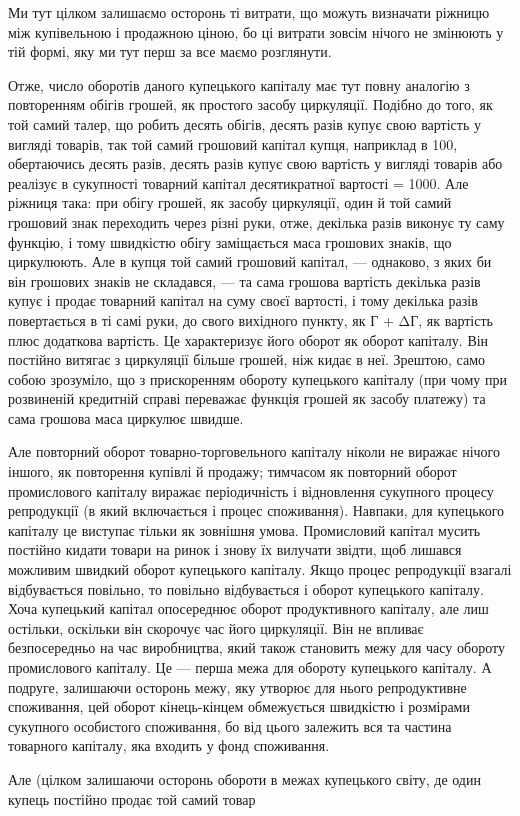 Ми тут цілком залишаємо осторонь ті витрати, що можуть
визначати ріжницю між купівельною і продажною ціною, бо ці
витрати зовсім нічого не змінюють у тій формі, яку ми тут
перш за все маємо розглянути.

Отже, число оборотів даного купецького капіталу має
тут повну аналогію з повторенням обігів грошей, як простого
засобу циркуляції. Подібно до того, як той самий талер, що
робить десять обігів, десять разів купує свою вартість у вигляді
товарів, так той самий грошовий капітал купця, наприклад
в 100, обертаючись десять разів, десять разів купує свою вартість
у вигляді товарів або реалізує в сукупності товарний капітал
десятикратної вартості = 1000. Але ріжниця така: при обігу
грошей, як засобу циркуляції, один й той самий грошовий знак
переходить через різні руки, отже, декілька разів виконує ту
саму функцію, і тому швидкістю обігу заміщається маса грошових
знаків, що циркулюють. Але в купця той самий грошовий
капітал, — однаково, з яких би він грошових знаків не складався, —
та сама грошова вартість декілька разів купує і продає товарний
капітал на суму своєї вартості, і тому декілька разів повертається
в ті самі руки, до свого вихідного пункту, як Г + ΔГ,
як вартість плюс додаткова вартість. Це характеризує його
оборот як оборот капіталу. Він постійно витягає з циркуляції
більше грошей, ніж кидає в неї. Зрештою, само собою зрозуміло,
що з прискоренням обороту купецького капіталу (при чому при
розвиненій кредитній справі переважає функція грошей як засобу
платежу) та сама грошова маса циркулює швидше.

Але повторний оборот товарно-торговельного капіталу ніколи
не виражає нічого іншого, як повторення купівлі й продажу;
тимчасом як повторний оборот промислового капіталу виражає
періодичність і відновлення сукупного процесу репродукції (в
який включається і процес споживання). Навпаки, для купецького
капіталу це виступає тільки як зовнішня умова. Промисловий
капітал мусить постійно кидати товари на ринок і знову їх вилучати
звідти, щоб лишався можливим швидкий оборот купецького
капіталу. Якщо процес репродукції взагалі відбувається
повільно, то повільно відбувається і оборот купецького капіталу.
Хоча купецький капітал опосереднює оборот продуктивного
капіталу, але лиш остільки, оскільки він скорочує час його циркуляції.
Він не впливає безпосередньо на час виробництва, який
також становить межу для часу обороту промислового капіталу.
Це — перша межа для обороту купецького капіталу. А подруге,
залишаючи осторонь межу, яку утворює для нього репродуктивне
споживання, цей оборот кінець-кінцем обмежується швидкістю
і розмірами сукупного особистого споживання, бо від цього
залежить вся та частина товарного капіталу, яка входить у фонд
споживання.

Але (цілком залишаючи осторонь обороти в межах купецького
світу, де один купець постійно продає той самий товар
\parbreak{}  %
